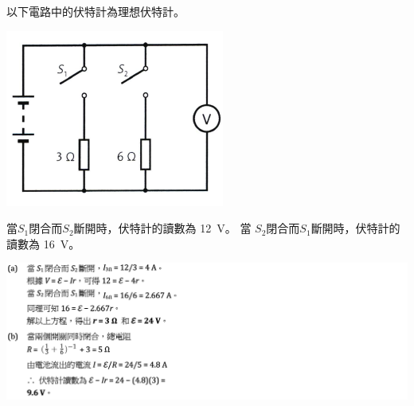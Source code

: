 {
    以下電路中的伏特計為理想伏特計。
    \par{\par\centering\includegraphics[width=.35\textwidth]{./img/ch2_circuit_lq_2024-06-14-14-23-50.png}\par}
    當$S_1$閉合而$S_2$斷開時，伏特計的讀數為 \qty{12}{V}。 當 $S_2$閉合而$S_1$斷開時，伏特計的讀數為 \qty{16}{V}。

}{
    \par{\par\centering\includegraphics[width=\textwidth]{./img/ch2_circuit_lq_2024-06-16-12-15-17.png}\par}
}